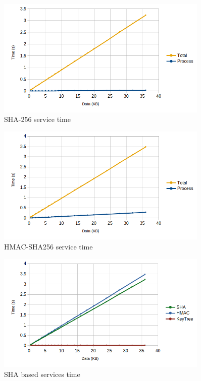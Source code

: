 \begin{figure}[h!]
	\centering
	\includegraphics[width=0.9\textwidth]{./Images/sha-time.png}
	\caption{SHA-256 service time}
	\label{fig:performance:sha:time}
\end{figure}

\begin{figure}[h!]
	\centering
	\includegraphics[width=0.9\textwidth]{./Images/hmac-time.png}
	\caption{HMAC-SHA256 service time}
	\label{fig:performance:hmac:time}
\end{figure}

\begin{figure}[h!]
	\centering
	\includegraphics[width=0.9\textwidth]{./Images/sha-time-compare.png}
	\caption{SHA based services time}
	\label{fig:performance:sha:compare}
\end{figure}

